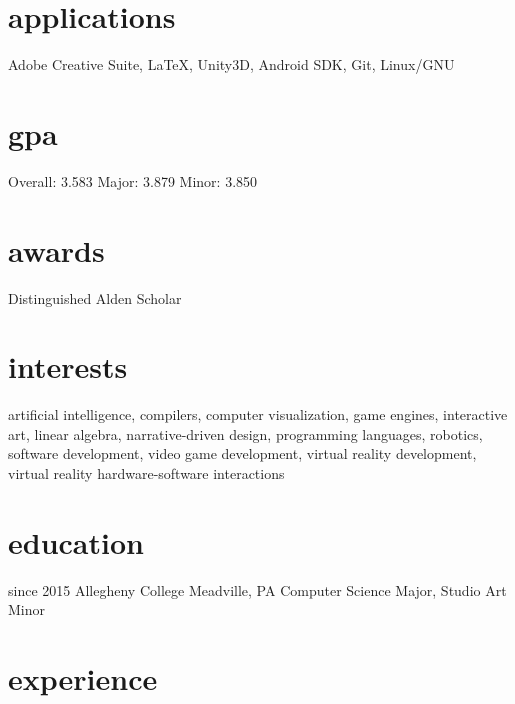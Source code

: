 \documentclass[]{friggeri-cv}
\begin{document}
\begin{aside}
  \section{applications}\vspace{0.05cm}
    Adobe Creative Suite, \LaTeX , Unity3D, Android SDK, Git, Linux/GNU
  \section{gpa}\vspace{0.1cm}
  	Overall: 3.583
  	Major: 3.879
  	Minor: 3.850\vspace{0.1cm}
  \section{awards}\vspace{0.05cm}
    Distinguished Alden Scholar\vspace{0.1cm}
\end{aside}

\section{interests}

artificial intelligence, compilers, computer visualization, game engines, interactive art, linear algebra, narrative-driven design, programming languages, robotics, software development, video game development, virtual reality development, virtual reality hardware-software interactions

\section{education}
\begin{entrylist}
  \entry
    {since 2015}
    {Allegheny College}
    {Meadville, PA}
    {Computer Science Major, Studio Art Minor}
\end{entrylist}

\section{experience}
\end{document}
